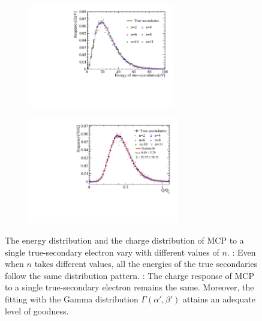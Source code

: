 \begin{figure}[h]
	\centering
	\begin{subfigure}{0.5\textwidth}
		\centering
		\includegraphics[height=4.5cm]{PMTRelated/GTmodel/single_pecharge.pdf}
		\caption{}
		\label{fig:single_pe}
	\end{subfigure}%
	\hfill
	\begin{subfigure}{0.5\textwidth}
		\centering
		\includegraphics[height=4.65cm]{PMTRelated/GTmodel/singlepefit.pdf}
		\caption{}
		\label{fig:single_fit}
	\end{subfigure}
	\caption{The energy distribution and the charge distribution of MCP to a single true-secondary electron vary with different values of \(n\). : Even when \(n\) takes different values, all the energies of the true secondaries follow the same distribution pattern. : The charge response of MCP to a single true-secondary electron remains the same. Moreover, the fitting with the Gamma distribution \(\varGamma(\alpha',\beta')\) attains an adequate level of goodness. }
	\label{fig:singlepe}
\end{figure}

